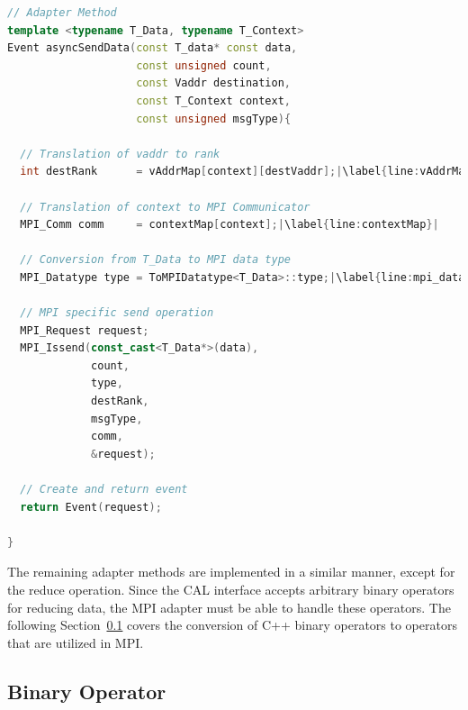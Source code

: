 \begin{lstlisting}[language=C++, breaklines=false, label={lst:adapter_send},escapechar=|]
// Adapter Method
template <typename T_Data, typename T_Context>      
Event asyncSendData(const T_data* const data, 
                    const unsigned count, 
                    const Vaddr destination, 
                    const T_Context context, 
                    const unsigned msgType){    

  // Translation of vaddr to rank
  int destRank      = vAddrMap[context][destVaddr];|\label{line:vAddrMap}|

  // Translation of context to MPI Communicator
  MPI_Comm comm     = contextMap[context];|\label{line:contextMap}|

  // Conversion from T_Data to MPI data type
  MPI_Datatype type = ToMPIDatatype<T_Data>::type;|\label{line:mpi_datatype}|

  // MPI specific send operation                                                                            
  MPI_Request request; 
  MPI_Issend(const_cast<T_Data*>(data), 
             count, 
             type,
             destRank, 
             msgType,
             comm,
             &request);

  // Create and return event
  return Event(request);                                                                                                       

}  
\end{lstlisting}

\noindent The remaining adapter methods are implemented in a similar
manner, except for the reduce operation. Since the CAL interface
accepts arbitrary binary operators for reducing data, the MPI adapter
must be able to handle these
operators. The following Section~\ref{sec:bin_operator} covers the conversion of C++
binary operators to operators that are utilized in MPI.

\subsection{Binary Operator}
\label{sec:bin_operator}

